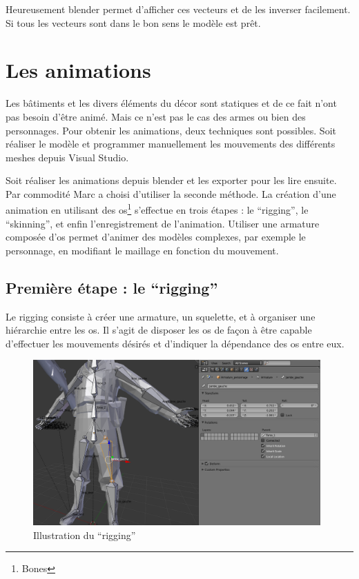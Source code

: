 \documentclass[11pt]{report}
\begin{document}
Heureusement blender permet d’afficher ces vecteurs et de les inverser facilement. Si tous les vecteurs sont dans le bon sens le modèle est prêt.

\section{Les animations}

Les bâtiments et les divers éléments du décor sont statiques et de ce fait n’ont pas besoin d’être animé. Mais ce n’est pas le cas des armes ou bien des personnages. Pour obtenir les animations, deux techniques sont possibles. Soit réaliser le modèle et programmer manuellement les mouvements des différents meshes depuis Visual Studio.

Soit réaliser les animations depuis blender et les exporter pour les lire ensuite. Par commodité Marc a choisi d’utiliser la seconde méthode. La création d’une animation en utilisant des os\footnote{Bones} s’effectue en trois étapes : le ``rigging'', le ``skinning'', et enfin l’enregistrement de l’animation. Utiliser une armature composée d'os permet d'animer des modèles complexes, par exemple le personnage, en modifiant le maillage en fonction du mouvement.

\subsection{Première étape : le ``rigging''}

Le rigging consiste à créer une armature, un squelette, et à organiser une hiérarchie entre les os.
Il s’agit de disposer les os de façon à être capable d’effectuer les mouvements désirés et d’indiquer la dépendance des os entre eux.

\begin{figure}[htbp]
\centering
\includegraphics[width=11cm]{rigging.png}
\caption{Illustration du ``rigging''}
\end{figure}
\end{document}
